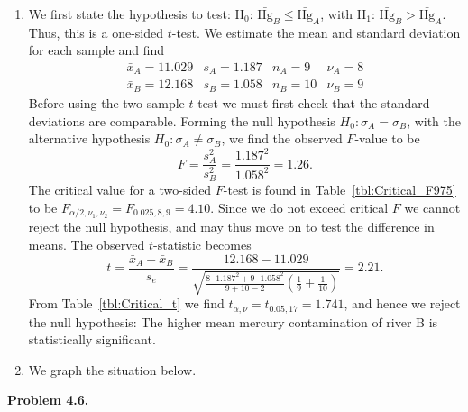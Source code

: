 \begin{enumerate}[label=\alph*)]
\item We first state the hypothesis to test: H$_0$: $\bar{\mbox{Hg}}_B \leq \bar{\mbox{Hg}}_A$,
with H$_1$: $\bar{\mbox{Hg}}_B > \bar{\mbox{Hg}}_A$.  Thus, this is a one-sided $t$-test.  We estimate the mean and
standard deviation for each sample and find
\[ \begin{array}{cccc}
\bar{x}_A = 11.029 & s_A = 1.187 & n_A = 9 & \nu_A = 8 \\
\bar{x}_B = 12.168 & s_B = 1.058 & n_B = 10 & \nu_B = 9
\end{array}
\]
Before using the two-sample $t$-test we must first check that the standard deviations are
comparable.  Forming the null hypothesis $H_0: \sigma_A = \sigma_B$, with the alternative
hypothesis $H_0: \sigma_A \neq \sigma_B$, we find the observed $F$-value to be
\[ F = \frac{s_A^2}{s_B^2} = \frac{1.187^2}{1.058^2} = 1.26. \]
The critical value for a two-sided $F$-test is found in Table~\ref{tbl:Critical_F975} to be
$F_{\alpha/2,\nu_1,\nu_2} = F_{0.025,8,9} = 4.10$.
Since we do not exceed critical $F$ we cannot reject the null hypothesis, and may thus move on to test
the difference in means. The observed $t$-statistic becomes
\[ t = \frac{\bar{x}_A - \bar{x}_B}{s_e} =
\frac{12.168 - 11.029}{\sqrt{\frac{8\cdot1.187^2 + 9\cdot1.058^2}{9 + 10 - 2} \left( \frac{1}{9} + \frac{1}{10} \right)}} = 2.21.
\]
From Table~\ref{tbl:Critical_t} we find $t_{\alpha,\nu} = t_{0.05,17} = 1.741$, and hence we
reject the null hypothesis: The higher mean mercury contamination of river B is statistically significant.
\item We graph the situation below.
\end{enumerate}

\noindent
\bf{Problem 4.6.} \\

